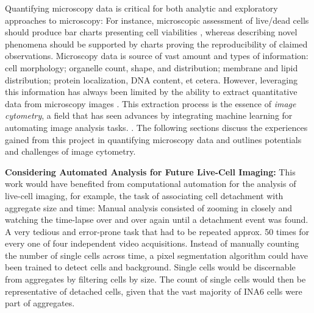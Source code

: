 %
\label{sec:discussion_potential_microscopy}%
Quantifying microscopy data is critical for both analytic and exploratory
approaches to microscopy: For instance, microscopic assessment of live/dead
cells should produce bar charts presenting cell viabilities
\cite{spaepenDigitalImageProcessing2011}, whereas describing novel phenomena
should be supported by charts proving the reproducibility of claimed
observations. Microscopy data is source of vast amount and types of information:
cell morphology; organelle count, shape, and distribution; membrane and lipid
distribution; protein localization, DNA content, et cetera. However, leveraging
this information has always been limited by the ability to extract quantitative
data from microscopy images \cite{galbraithPumpingVolume2023}. This extraction
process is the essence of \emph{image cytometry}, a field that has seen 
advances by integrating machine learning for automating image analysis tasks.
\cite{guptaDeepLearningImage2019}. The following sections discuss the
experiences gained from this project in quantifying microscopy data and outlines
potentials and challenges of image cytometry.





\textbf{Considering Automated Analysis for Future Live-Cell Imaging:}
This work would have benefited from computational automation for the analysis of
live-cell imaging, for example, the task of associating \INA cell detachment
with \INA aggregate size and time: Manual analysis consisted of zooming in
closely and watching the time-lapse over and over again until a detachment event
was found. A very tedious and error-prone task that had to be repeated approx.
50 times for every one of four independent video acquisitions. Instead of
manually counting the number of single \INA cells across time, a pixel
segmentation algorithm could have been trained to detect cells and background.
Single cells would be discernable from aggregates by filtering cells by size.
The count of single cells would then be representative of detached cells, given
that the vast majority of INA6 cells were part of aggregates.



